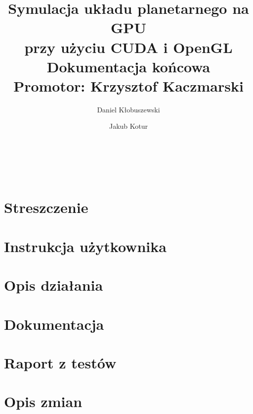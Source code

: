\documentclass[a4paper,titlepage,10pt]{article}
\title{\huge Symulacja układu planetarnego na GPU\\ przy użyciu CUDA i OpenGL\\\small Dokumentacja końcowa\\\large Promotor: Krzysztof Kaczmarski}
\author{Daniel Kłobuszewski\and Jakub Kotur}
\begin{document}
	\maketitle
	
	\pagestyle{fancyplain}
	\cfoot{\thepage/\pageref{LastPage}}

	\hfill \\
	
	\hfill \\
	

	\newpage

	\tableofcontents
	\newpage

	\section{Streszczenie}\label{sec:streszczenie}
	
	\section{Instrukcja użytkownika}\label{sec:instrukcja użytkownika}
	
	\section{Opis działania}\label{sec:opis dzialania}
	
	\section{Dokumentacja}\label{sec:dokumentacja}
	
	\section{Raport z testów}\label{sec:raport z testów}
	
	\section{Opis zmian}\label{sec:opis zmian}
	
\end{document}
